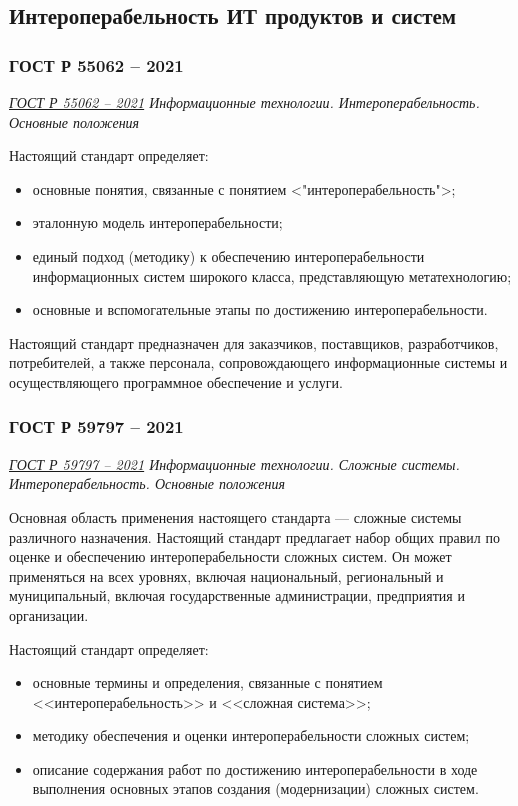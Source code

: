 


\subsection{Интероперабельность ИТ продуктов и систем}

\subsubsection{ГОСТ Р 55062 -- 2021}

\emph{\href{https://docs.cntd.ru/document/1200181340}{ГОСТ Р 55062 -- 2021}
Информационные технологии. Интероперабельность. Основные положения
}

Настоящий стандарт определяет:

\begin{itemize}
	\item основные понятия, связанные с понятием <"интероперабельность">;
	\item эталонную модель интероперабельности;
	\item единый подход (методику) к обеспечению интероперабельности
		информационных систем широкого класса, представляющую метатехнологию;
	\item основные и вспомогательные этапы по достижению интероперабельности.
\end{itemize}

Настоящий стандарт предназначен для заказчиков, поставщиков, разработчиков,
потребителей, а также персонала, сопровождающего информационные системы
и осуществляющего программное обеспечение и услуги.

\subsubsection{ГОСТ Р 59797 -- 2021}

\emph{\href{https://docs.cntd.ru/document/1200181353}{ГОСТ Р 59797 -- 2021}
Информационные технологии. Сложные системы. Интероперабельность. Основные положения
}

Основная область применения настоящего стандарта
--- сложные системы различного назначения.
Настоящий стандарт предлагает набор общих правил по оценке
и обеспечению интероперабельности сложных систем.
Он может применяться на всех уровнях, включая национальный,
региональный и муниципальный,
включая государственные администрации, предприятия и организации.

Настоящий стандарт определяет:

\begin{itemize}
	\item основные термины и определения,
		связанные с понятием <<интероперабельность>> и <<сложная система>>;
	\item методику обеспечения
		и оценки интероперабельности сложных систем;
	\item описание содержания работ
		по достижению интероперабельности в ходе выполнения основных
		этапов создания (модернизации) сложных систем.
\end{itemize}

